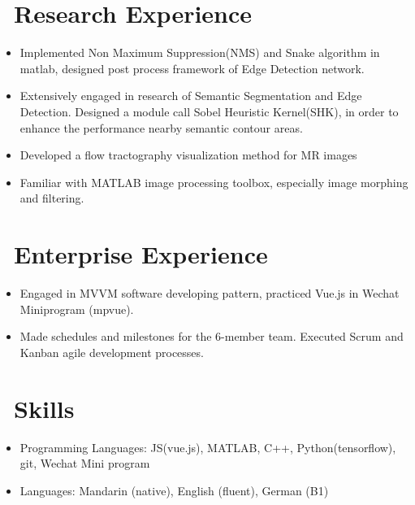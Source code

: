 \documentclass{resume}
\begin{document}
\section{\faFlask\ Research Experience}


\begin{itemize}
	\item Implemented Non Maximum Suppression(NMS) and Snake algorithm in matlab, designed post process framework of Edge Detection network.
	\item Extensively engaged in research of Semantic Segmentation and Edge Detection. Designed a module call Sobel Heuristic Kernel(SHK), in order to enhance the performance nearby semantic contour areas.
\end{itemize}


\begin{itemize}
  \item Developed a flow tractography visualization method for MR images
  \item Familiar with MATLAB image processing toolbox, especially image morphing and filtering.
\end{itemize}

\section{\faUsers\ Enterprise Experience}

\begin{itemize}
	\item Engaged in MVVM software developing pattern, practiced Vue.js in Wechat Miniprogram (mpvue).
	\item Made schedules and milestones for the 6-member team. Executed Scrum and Kanban agile development processes.

\end{itemize}

\section{\faCogs\ Skills}
\begin{itemize}[parsep=0.5ex]
  \item Programming Languages: JS(vue.js), MATLAB, C++, Python(tensorflow), git, Wechat Mini program
    \item Languages: Mandarin (native), English (fluent), German (B1)
\end{itemize}

%
%
\end{document}
